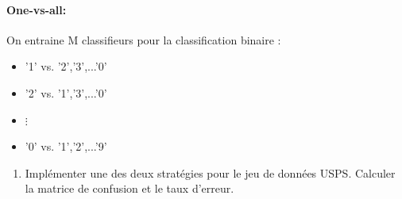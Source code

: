 \paragraph{One-vs-all:} On entraine M classifieurs pour la classification binaire :
\begin{itemize}[label=-]
	\item '1' vs. '2','3',...'0'
	\item '2' vs. '1','3',...'0'
	\item $\vdots$
	\item '0' vs. '1','2',...'9'
\end{itemize}

\begin{enumerate}
	\item Implémenter une des deux stratégies pour le jeu de données USPS. Calculer la matrice de confusion et le taux d'erreur. 
\end{enumerate}
